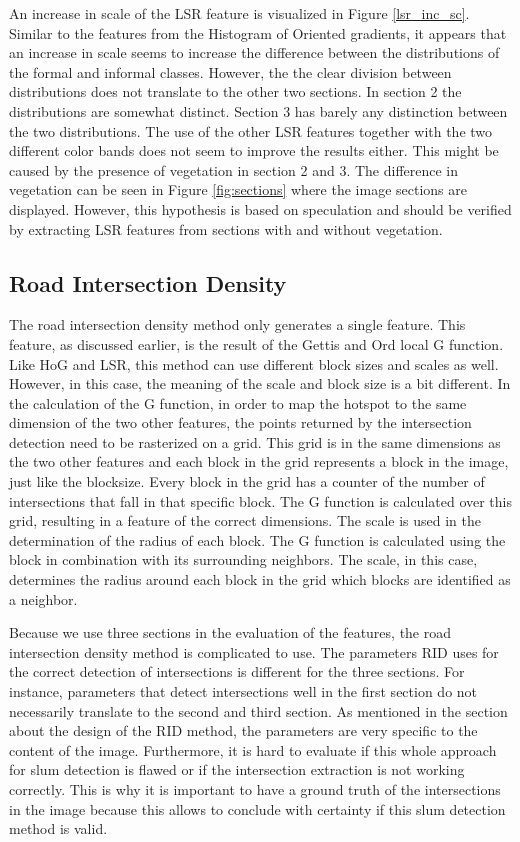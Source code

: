 An increase in scale of the LSR feature is visualized in Figure
\ref{lsr_inc_sc}. Similar to the features from the Histogram of Oriented gradients, it appears
that an increase in scale seems to increase the difference between the
distributions of the formal and informal classes.  However, the the clear
division between distributions does not translate to the other two sections. In
section 2 the distributions are somewhat distinct. Section 3 has barely any
distinction between the two distributions. The use of the other LSR features
together with the two different color bands does not seem to improve the results either. This might be caused by the presence of vegetation in section 2 and 3. The difference in vegetation can
be seen in Figure \ref{fig:sections} where the image sections are displayed. However, this hypothesis is based on speculation and should be verified by extracting LSR features from sections with and without vegetation.

\subsection{Road Intersection Density}

The road intersection density method only generates a single feature. This feature, as discussed earlier, is the result of the Gettis and Ord local G function. Like HoG and LSR, this method can use different block sizes and scales as well. However, in this case, the meaning of the scale and block size is a bit different. In the calculation of the G function, in order to map the hotspot to the same dimension of the two other features, the points returned by the intersection detection need to be rasterized on a grid. This grid is in the same dimensions as the two other features and each block in the grid represents a block in the image, just like the blocksize. Every block in the grid has a counter of the number of intersections that fall in that specific block. The G function is calculated over this grid, resulting in a feature of the correct dimensions. The scale is used in the determination of the radius of each block. The G function is calculated using the block in combination with its surrounding neighbors. The scale, in this case, determines the radius around each block in the grid which blocks are identified as a neighbor.

Because we use three sections in the evaluation of the features, the road intersection density method is complicated to use. The parameters RID uses for the correct detection of intersections is different for the three sections. For instance, parameters that detect intersections well in the first section do not necessarily translate to the second and third section. As mentioned in the section about the design of the RID method, the parameters are very specific to the content of the image. Furthermore, it is hard to evaluate if this whole approach for slum detection is flawed or if the intersection extraction is not working correctly. This is why it is important to have a ground truth of the intersections in the image because this allows to conclude with certainty if this slum detection method is valid.

